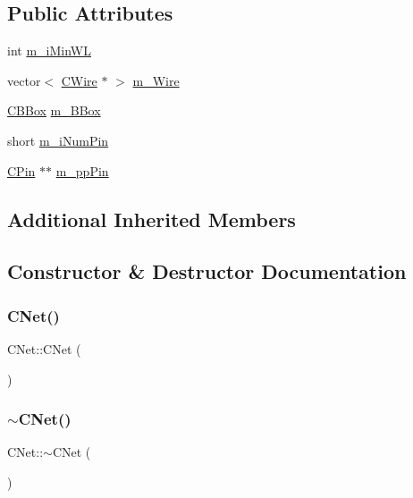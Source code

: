 \subsection*{Public Attributes}
\begin{DoxyCompactItemize}
\item 
int \mbox{\hyperlink{classCNet_aa62350e3739f116eab0ddae6ac241977}{m\+\_\+i\+Min\+WL}}
\item 
vector$<$ \mbox{\hyperlink{classCWire}{C\+Wire}} $\ast$ $>$ \mbox{\hyperlink{classCNet_ac281ee8db817b1e7119790fac1e1ba52}{m\+\_\+\+Wire}}
\item 
\mbox{\hyperlink{classCBBox}{C\+B\+Box}} \mbox{\hyperlink{classCNet_ab13d4169f4cf723e4750dac55f5da3ad}{m\+\_\+\+B\+Box}}
\item 
short \mbox{\hyperlink{classCNet_a61a76d767c5d9fc96337e5c962010765}{m\+\_\+i\+Num\+Pin}}
\item 
\mbox{\hyperlink{classCPin}{C\+Pin}} $\ast$$\ast$ \mbox{\hyperlink{classCNet_ad10615408ef536cbbf834a644f15f574}{m\+\_\+pp\+Pin}}
\end{DoxyCompactItemize}
\subsection*{Additional Inherited Members}


\subsection{Constructor \& Destructor Documentation}
\mbox{\label{classCNet_aafe21b654acdaa4118d359766dc30d18}} 
\subsubsection{\texorpdfstring{CNet()}{CNet()}}
{\footnotesize\ttfamily C\+Net\+::\+C\+Net (\begin{DoxyParamCaption}{ }\end{DoxyParamCaption})}

\mbox{\label{classCNet_a7cca1940642bf76e663685f011f20067}} 
\subsubsection{\texorpdfstring{$\sim$CNet()}{~CNet()}}
{\footnotesize\ttfamily C\+Net\+::$\sim$\+C\+Net (\begin{DoxyParamCaption}{ }\end{DoxyParamCaption})\hspace{0.3cm}{\ttfamily [virtual]}}



